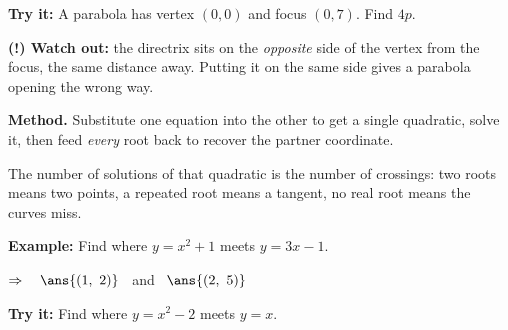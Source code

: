 \documentclass[12pt]{article}
\begin{document}
\begin{tryitbox}
\textbf{Try it:} \quad A parabola has vertex $(0,0)$ and focus $(0, 7)$. Find $4p$.\\[2pt]
\end{tryitbox}

\begin{watchoutbox}
\textbf{(!) Watch out:} the directrix sits on the \emph{opposite} side of the vertex from the focus, the same distance away. Putting it on the same side gives a parabola opening the wrong way.
\end{watchoutbox}


\begin{formulabox}
\textbf{Method.} Substitute one equation into the other to get a single quadratic, solve it, then feed \emph{every} root back to recover the partner coordinate.\par
The number of solutions of that quadratic is the number of crossings: two roots means two points, a repeated root means a tangent, no real root means the curves miss.
\end{formulabox}

\begin{examplebox}
\textbf{Example:} \quad Find where $y = x^{2} + 1$ meets $y = 3x - 1$.

$\Rightarrow\quad \ans{(1,\ 2)}$ \ and \ $\ans{(2,\ 5)}$
\end{examplebox}

\begin{tryitbox}
\textbf{Try it:} \quad Find where $y = x^{2} - 2$ meets $y = x$.\\[2pt]
\end{tryitbox}
\end{document}
